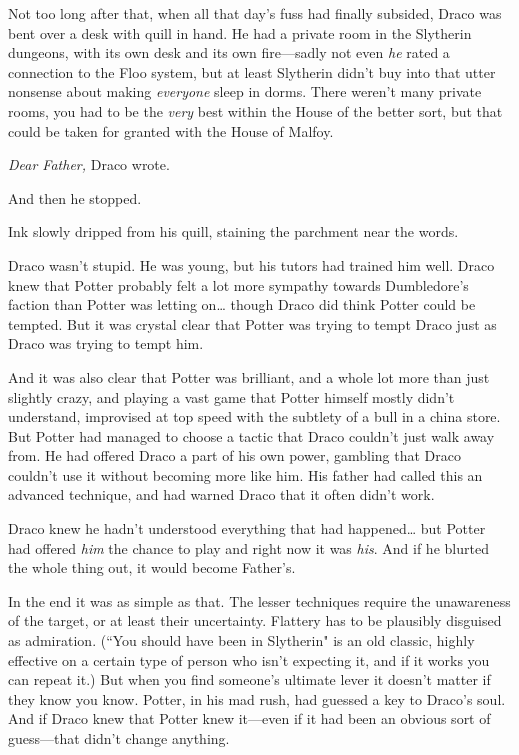 
Not too long after that, when all that day's fuss had finally subsided, Draco was bent over a desk with quill in hand. He had a private room in the Slytherin dungeons, with its own desk and its own fire—sadly not even \emph{he} rated a connection to the Floo system, but at least Slytherin didn't buy into that utter nonsense about making \emph{everyone} sleep in dorms. There weren't many private rooms, you had to be the \emph{very} best within the House of the better sort, but that could be taken for granted with the House of Malfoy.

\emph{Dear Father,} Draco wrote.

And then he stopped.

Ink slowly dripped from his quill, staining the parchment near the words.

Draco wasn't stupid. He was young, but his tutors had trained him well. Draco knew that Potter probably felt a lot more sympathy towards Dumbledore's faction than Potter was letting on{\ldots} though Draco did think Potter could be tempted. But it was crystal clear that Potter was trying to tempt Draco just as Draco was trying to tempt him.

And it was also clear that Potter was brilliant, and a whole lot more than just slightly crazy, and playing a vast game that Potter himself mostly didn't understand, improvised at top speed with the subtlety of a bull in a china store. But Potter had managed to choose a tactic that Draco couldn't just walk away from. He had offered Draco a part of his own power, gambling that Draco couldn't use it without becoming more like him. His father had called this an advanced technique, and had warned Draco that it often didn't work.

Draco knew he hadn't understood everything that had happened{\ldots} but Potter had offered \emph{him} the chance to play and right now it was \emph{his}. And if he blurted the whole thing out, it would become Father's.

In the end it was as simple as that. The lesser techniques require the unawareness of the target, or at least their uncertainty. Flattery has to be plausibly disguised as admiration. (``You should have been in Slytherin" is an old classic, highly effective on a certain type of person who isn't expecting it, and if it works you can repeat it.) But when you find someone's ultimate lever it doesn't matter if they know you know. Potter, in his mad rush, had guessed a key to Draco's soul. And if Draco knew that Potter knew it—even if it had been an obvious sort of guess—that didn't change anything.

